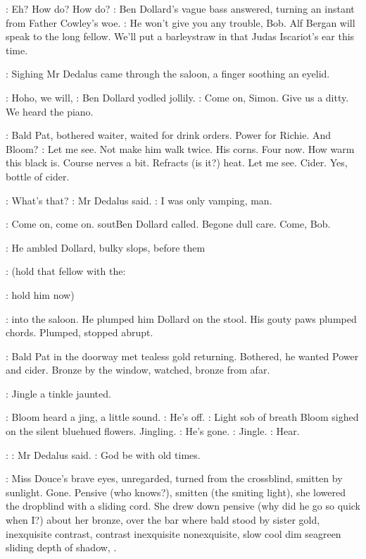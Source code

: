 \Dollard:
Eh? How do? How do?
:
Ben Dollard's vague bass answered, turning an
instant from Father Cowley's woe.
\Dollard:
He won't give you any trouble, Bob. Alf
Bergan will speak to the long fellow. We'll put a barleystraw in that
Judas Iscariot's ear this time.

:
Sighing Mr Dedalus came through the saloon,
a finger soothing an
eyelid.

\Dollard:
Hoho, we will,
:
Ben Dollard yodled jollily.
\Dollard:
Come on, Simon. Give us a
ditty. We heard the piano.

:
Bald Pat, bothered waiter, waited for drink orders. Power for Richie.
And Bloom?
\BloomInt:
Let me see. Not make him walk twice. His corns. Four now.
How warm this black is. Course nerves a bit. Refracts (is it?) heat. Let
me see. Cider. Yes, bottle of cider.

\Simon:
What's that?
:
Mr Dedalus said.
\Simon:
I was only vamping, man.

\Dollard:
Come on, come on.
sout{Ben Dollard called.}
Begone dull care. Come, Bob.

:
He ambled Dollard, bulky slops, before them

\Simon:
(hold that fellow with the:

\Dollard:
hold him now)

:
into the saloon. He plumped him Dollard on the stool.
His gouty paws plumped chords. Plumped, stopped abrupt.

:
Bald Pat in the doorway met tealess gold returning. Bothered, he
wanted Power and cider. Bronze by the window, watched, bronze from
afar.

:
Jingle a tinkle jaunted.

:
Bloom heard a jing, a little sound.
\BloomInt:
He's off.
:
Light sob of breath Bloom sighed on the silent bluehued flowers.
Jingling.
\BloomInt:
He's gone.
:
Jingle.
\BloomInt:
Hear.

\Simon:
:
Mr Dedalus said.
\Simon:
God be with old times.

:
Miss Douce's brave eyes, unregarded,
turned from the crossblind,
smitten by sunlight. Gone. Pensive (who knows?), smitten (the smiting
light), she lowered the dropblind with a sliding cord. She drew down
pensive (why did he go so quick when I?) about her bronze, over the bar
where bald stood by sister gold, inexquisite contrast, contrast
inexquisite nonexquisite, slow cool dim seagreen sliding depth of shadow,
.

